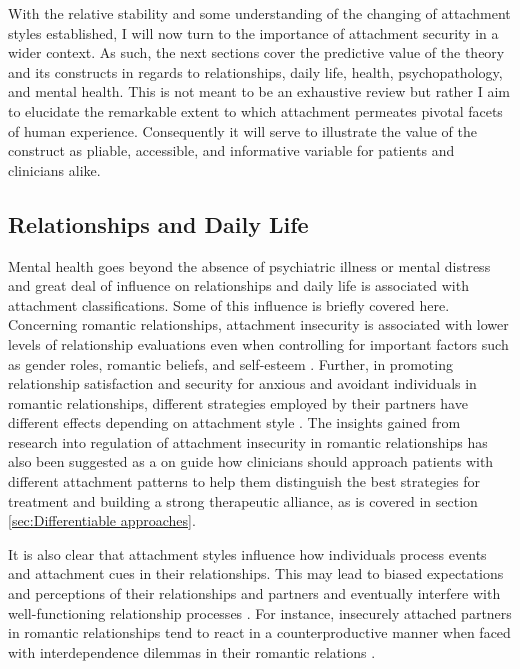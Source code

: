 \documentclass[12pt]{report}
\begin{document}
With the relative stability and some understanding of the changing of attachment styles established, I will now turn to the importance of attachment security in a wider context. As such, the next sections cover the predictive value of the theory and its constructs in regards to relationships, daily life, health, psychopathology, and mental health. This is not meant to be an exhaustive review but rather I aim to elucidate the remarkable extent to which attachment permeates pivotal facets of human experience. Consequently it will serve to illustrate the value of the construct as pliable, accessible, and informative variable for patients and clinicians alike.

\subsection{Relationships and Daily Life}
Mental health goes beyond the absence of psychiatric illness or mental distress and great deal of influence on relationships and daily life is associated with attachment classifications. Some of this influence is briefly covered here.
Concerning romantic relationships, attachment insecurity is associated with lower levels of relationship evaluations even when controlling for important factors such as gender roles, romantic beliefs, and self-esteem \cite{Rodriguez2021, Jones1996}.
Further, in promoting relationship satisfaction and security for anxious and avoidant individuals in romantic relationships, different strategies employed by their partners have different effects depending on attachment style \cite{Overall2015}. The insights gained from research into regulation of attachment insecurity in romantic relationships has also been suggested as a on guide how clinicians should approach patients with different attachment patterns to help them distinguish the best strategies for treatment and building a strong therapeutic alliance, as is covered in section \ref{sec:Differentiable approaches}.

It is also clear that attachment styles influence how individuals process events and attachment cues in their relationships. This may lead to biased expectations and perceptions of their relationships and partners and eventually interfere with well-functioning relationship processes \cite{Collins2007, Collins2004, Hazan1994, Mikulincer2003, Rodriguez2019}.
For instance, insecurely attached partners in romantic relationships tend to react in a counterproductive manner when faced with interdependence dilemmas in their romantic relations \cite{Simpson2012}.
\end{document}
